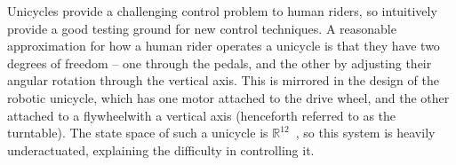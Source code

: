 \documentclass[main.tex]{subfiles}
\begin{document}
	Unicycles provide a challenging control problem to human riders, so intuitively provide a good testing ground for new control techniques.
	A reasonable approximation for how a human rider operates a unicycle is that they have two degrees of freedom -- one through the pedals, and the other by adjusting their angular rotation through the vertical axis.
	This is mirrored in the design of the robotic unicycle, which has one motor attached to the drive wheel, and the other attached to a flywheel\footnotemark with a vertical axis (henceforth referred to as the turntable).
	The state space of such a unicycle is $\mathbb{R}^{12}$~\cite{forster}, so this system is heavily underactuated, explaining the difficulty in controlling it.

\end{document}
